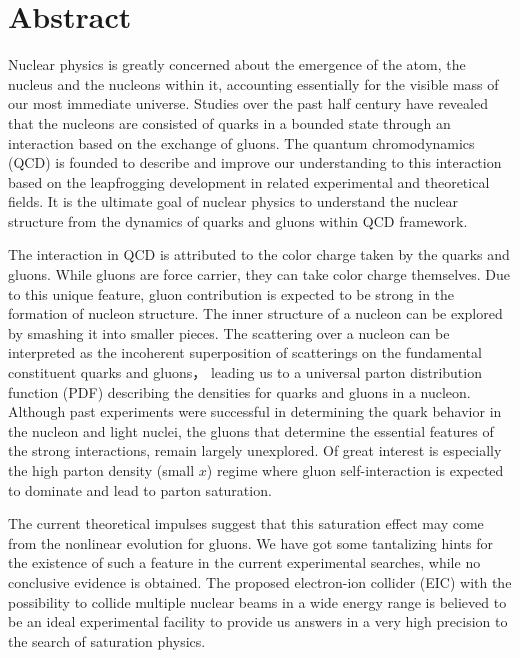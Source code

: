 \chapter*{\LARGE \bfseries {Abstract}}

\normalsize { 

Nuclear physics is greatly concerned about the emergence of the atom, the nucleus
and the nucleons within it, accounting essentially for the visible mass of our
most immediate universe. Studies over the past half century have revealed that
the nucleons are consisted of quarks in a bounded state through an interaction
based on the exchange of gluons. The quantum chromodynamics (QCD) is founded to
describe and improve our understanding to this interaction based on the
leapfrogging development in related experimental and theoretical fields. It is
the ultimate goal of nuclear physics to understand the nuclear structure from
the dynamics of quarks and gluons within QCD framework.

The interaction in QCD is attributed to the color charge taken by the quarks
and gluons. While gluons are force carrier, they can take color charge themselves.
Due to this unique feature, gluon contribution is expected to be strong in the
formation of nucleon structure. The inner structure of a nucleon can be explored
by smashing it into smaller pieces. The scattering over a nucleon can be interpreted
as the incoherent superposition of scatterings on the fundamental constituent
quarks and gluons， leading us to a universal parton distribution function (PDF)
describing the densities for quarks and gluons in a nucleon. Although past
experiments were successful in determining the quark behavior in the nucleon and
light nuclei, the gluons that determine the essential features of the strong
interactions, remain largely unexplored. Of great interest is especially the
high parton density (small $x$) regime where gluon self-interaction is expected to
dominate and lead to parton saturation. 

The current theoretical impulses suggest that this saturation effect may come
from the nonlinear evolution for gluons. We have got some tantalizing hints
for the existence of such a feature in the current experimental searches, while
no conclusive evidence is obtained. The proposed electron-ion collider (EIC) with
the possibility to collide multiple nuclear beams in a wide energy range is
believed to be an ideal experimental facility to provide us answers in a very high
precision to the search of saturation physics.

}
